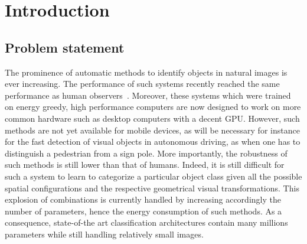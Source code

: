 \section{Introduction}

\subsection{Problem statement}

The prominence of automatic methods to identify objects in natural images is ever increasing. The performance of such systems recently reached the same performance as human observers~\citep{He15}. Moreover, these systems which were trained on energy greedy, high performance computers are now designed to work on more common hardware such as desktop computers with a decent GPU. However, such methods are not yet available for mobile devices, as will be necessary for instance for the fast detection of visual objects in autonomous driving, as when one has to distinguish a pedestrian from a sign pole. More importantly, the robustness of such methods is still lower than that of humans. Indeed, it is still difficult for such a system to learn to categorize a particular object class given all the possible spatial configurations and the respective geometrical visual transformations. This explosion of combinations is currently handled by increasing accordingly the number of parameters, hence the energy consumption of such methods. As a consequence, state-of-the art classification architectures contain many millions parameters while still handling relatively small images.

